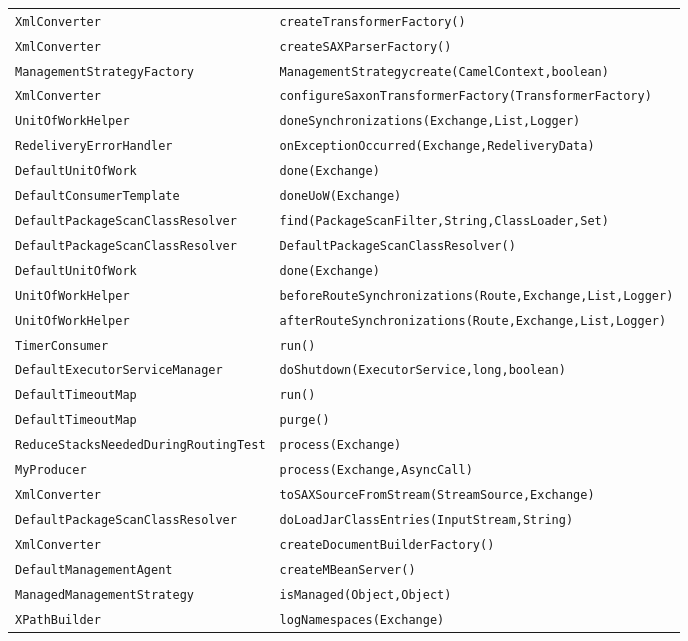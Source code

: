 \begin{center}
\begin{longtable}{ll}
\lstinline/XmlConverter/&{\lstinline/createTransformerFactory()/}\\
\lstinline/XmlConverter/&{\lstinline/createSAXParserFactory()/}\\
\lstinline/ManagementStrategyFactory/&{\lstinline/ManagementStrategycreate(CamelContext,boolean)/}\\
\lstinline/XmlConverter/&{\lstinline/configureSaxonTransformerFactory(TransformerFactory)/}\\
\lstinline/UnitOfWorkHelper/&{\lstinline/doneSynchronizations(Exchange,List,Logger)/}\\
\lstinline/RedeliveryErrorHandler/&{\lstinline/onExceptionOccurred(Exchange,RedeliveryData)/}\\
\lstinline/DefaultUnitOfWork/&{\lstinline/done(Exchange)/}\\
\lstinline/DefaultConsumerTemplate/&{\lstinline/doneUoW(Exchange)/}\\
\lstinline/DefaultPackageScanClassResolver/&{\lstinline/find(PackageScanFilter,String,ClassLoader,Set)/}\\
\lstinline/DefaultPackageScanClassResolver/&{\lstinline/DefaultPackageScanClassResolver()/}\\
\lstinline/DefaultUnitOfWork/&{\lstinline/done(Exchange)/}\\
\lstinline/UnitOfWorkHelper/&{\lstinline/beforeRouteSynchronizations(Route,Exchange,List,Logger)/}\\
\lstinline/UnitOfWorkHelper/&{\lstinline/afterRouteSynchronizations(Route,Exchange,List,Logger)/}\\
\lstinline/TimerConsumer/&{\lstinline/run()/}\\
\lstinline/DefaultExecutorServiceManager/&{\lstinline/doShutdown(ExecutorService,long,boolean)/}\\
\lstinline/DefaultTimeoutMap/&{\lstinline/run()/}\\
\lstinline/DefaultTimeoutMap/&{\lstinline/purge()/}\\
\lstinline/ReduceStacksNeededDuringRoutingTest/&{\lstinline/process(Exchange)/}\\
\lstinline/MyProducer/&{\lstinline/process(Exchange,AsyncCall)/}\\
\lstinline/XmlConverter/&{\lstinline/toSAXSourceFromStream(StreamSource,Exchange)/}\\
\lstinline/DefaultPackageScanClassResolver/&{\lstinline/doLoadJarClassEntries(InputStream,String)/}\\
\lstinline/XmlConverter/&{\lstinline/createDocumentBuilderFactory()/}\\
\lstinline/DefaultManagementAgent/&{\lstinline/createMBeanServer()/}\\
\lstinline/ManagedManagementStrategy/&{\lstinline/isManaged(Object,Object)/}\\
\lstinline/XPathBuilder/&{\lstinline/logNamespaces(Exchange)/}\\
\end{longtable}
\end{center}


